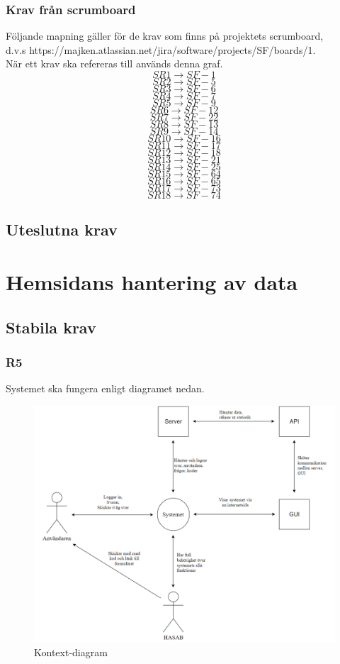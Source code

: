\documentclass{article}
\begin{document}
\subsubsection*{Krav från scrumboard}
Följande mapning gäller för de krav som finns på projektets scrumboard,\\ d.v.s https://majken.atlassian.net/jira/software/projects/SF/boards/1.\\
När ett krav ska refereras till används denna graf.\\
$$SR1\rightarrow SF-1$$
$$SR2\rightarrow SF-5$$
$$SR3\rightarrow SF-6$$
$$SR4\rightarrow SF-7$$
$$SR5\rightarrow SF-9$$
$$SR6\rightarrow SF-12$$
$$SR7\rightarrow SF-22$$
$$SR8\rightarrow SF-13$$
$$SR9\rightarrow SF-14$$
$$SR10\rightarrow SF-16$$
$$SR11\rightarrow SF-17$$
$$SR12\rightarrow SF-18$$
$$SR13\rightarrow SF-21$$
$$SR14\rightarrow SF-25$$
$$SR15\rightarrow SF-64$$
$$SR16\rightarrow SF-65$$
$$SR17\rightarrow SF-73$$
$$SR18\rightarrow SF-74$$

    \subsection*{Uteslutna krav}
    
    \newpage
     \section{Hemsidans hantering av data}
    
    \subsection*{Stabila krav}
    \subsubsection*{R5}
    Systemet ska fungera enligt diagramet nedan.
    
    \begin{figure}[h!]
    \includegraphics[width=150mm]{Kontextdiagram.png}
    \caption{Kontext-diagram}
    \end{figure}
    
\end{document}
